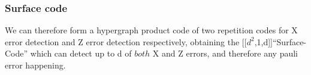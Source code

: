 \subsubsection{Surface code}
We can therefore form a hypergraph product code of two repetition
codes for X error detection and Z error detection respectively,
obtaining the [[$d^2$,1,d]]``Surface-Code'' which can detect up
to d of $both$ X and Z errors, and 
therefore any pauli error happening.